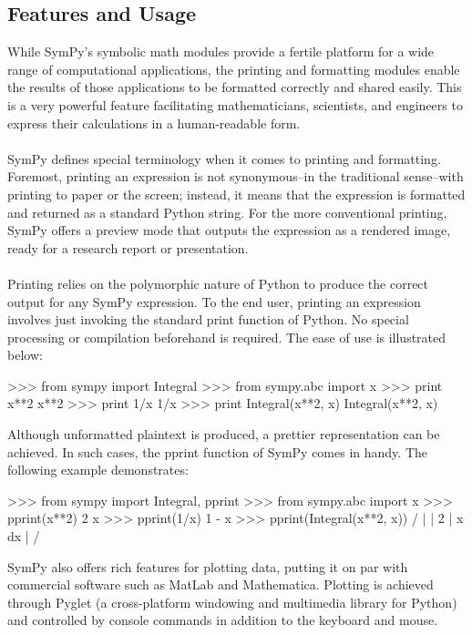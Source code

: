 \documentclass[11pt,a4paper,oneside]{report}
\begin{document}
\subsection*{Features and Usage}
While SymPy’s symbolic math modules provide a fertile platform for a wide range of computational applications, the printing and formatting modules enable the results of those applications to be formatted correctly and shared easily. This is a very powerful feature facilitating mathematicians, scientists, and engineers to express their calculations in a human-readable form.\\\\
SymPy defines special terminology when it comes to printing and formatting. Foremost, printing an expression is not synonymous–in the traditional sense–with printing to paper or the screen; instead, it means that the expression is formatted and returned as a standard Python string. For the more conventional printing, SymPy offers a preview mode that outputs the expression as a rendered image, ready for a research report or presentation.\\\\
Printing relies on the polymorphic nature of Python to produce the correct output for any SymPy expression. To the end user, printing an expression involves just invoking the standard print function of Python. No special processing or compilation beforehand is required. The ease of use is illustrated below:
\begin{verbatimtab}
>>> from sympy import Integral
>>> from sympy.abc import x
>>> print x**2
x**2
>>> print 1/x
1/x
>>> print Integral(x**2, x)
Integral(x**2, x)
\end{verbatimtab}
Although unformatted plaintext is produced, a prettier representation can be achieved. In such cases, the pprint function of SymPy comes in handy. The following example demonstrates:
\begin{verbatimtab}
>>> from sympy import Integral, pprint
>>> from sympy.abc import x
>>> pprint(x**2)
 2
x
>>> pprint(1/x)
1
-
x
>>> pprint(Integral(x**2, x))
  /
  |
  |  2
  | x  dx
  |
 /
\end{verbatimtab}
SymPy also offers rich features for plotting data, putting it on par with commercial software such as MatLab and Mathematica. Plotting is achieved through Pyglet (a cross-platform windowing and multimedia library for Python) and controlled by console commands in addition to the keyboard and mouse.\\\\
\end{document}
